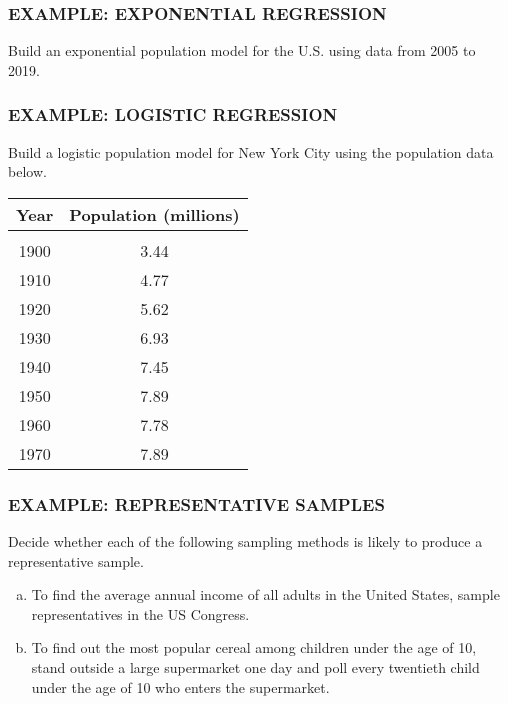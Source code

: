 \documentclass[8pt]{beamer}
\newcommand{\extitle}[1]{\frametitle{\fontfamily{fvs}\selectfont \small\color{black!70!blue!80!cyan}\uppercase{\bfseries Example: #1}}}
\newenvironment{exsol}
{
\begin{tcolorbox}[colframe=black!50!blue!50!cyan,
colback=white,
bottomrule=0mm,
rightrule=0mm,
sharp corners=all] 

}
{ \end{tcolorbox}}
\begin{document}
\begin{frame}
\extitle{Exponential Regression}
Build an exponential population model for the U.S. using data from 2005 to 2019.

\begin{exsol}
\vspace{3in}
\text{}
\end{exsol}
\end{frame}

\begin{frame}
\extitle{Logistic Regression}
Build a logistic population model for New York City using the population data below.
\begin{center}
\begin{tabular}{c c}
\textbf{Year} & \textbf{Population (millions)}\\
\hline
& \\
1900 & 3.44\\
1910 & 4.77\\
1920 & 5.62\\ 
1930 & 6.93\\
1940 & 7.45\\
1950 & 7.89\\
1960 & 7.78\\
1970 & 7.89\\
\end{tabular}
\end{center}

\begin{exsol}
\vspace{3in}
\text{}
\end{exsol}
\end{frame}

\begin{frame}
\extitle{Representative Samples}
Decide whether each of the following sampling methods is likely to produce a representative sample.

\begin{enumerate}[(a)]
\item To find the average annual income of all adults in the United States, sample representatives in the US Congress.
\item To find out the most popular cereal among children under the age of 10, stand outside a large supermarket one day and poll every twentieth child under the age of 10 who enters the supermarket.
\end{enumerate}

\begin{exsol}
\vspace{3in}
\text{}
\end{exsol}
\end{frame}
\end{document}

